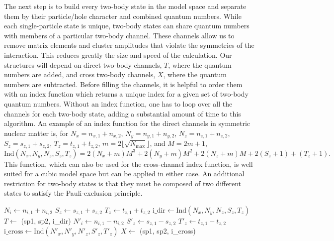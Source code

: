   The next step is to build every two-body state in the model space
  and separate them by their particle/hole character and combined
  quantum numbers. While each single-particle state is unique,
  two-body states can share quantum numbers with members of a
  particular two-body channel. These channels allow us to remove
  matrix elements and cluster amplitudes that violate the symmetries
  of the interaction. This reduces greatly the size and speed of the
  calculation. Our structures will depend on direct two-body channels,
  $T$, where the quantum numbers are added, and cross two-body
  channels, $X$, where the quantum numbers are subtracted. Before
  filling the channels, it is helpful to order them with an index
  function which returns a unique index for a given set of two-body
  quantum numbers. Without an index function, one has to loop over all
  the channels for each two-body state, adding a substantial amount
  of time to this algorithm. An example of an index function for the
  direct channels in symmetric nuclear matter is, for
  $N_{x}=n_{x,1}+n_{x,2}$, $N_{y}=n_{y,1}+n_{y,2}$,
  $N_{z}=n_{z,1}+n_{z,2}$, $S_{z}=s_{z,1}+s_{z,2}$,
  $T_{z}=t_{z,1}+t_{z,2}$, $m=2\lfloor\sqrt{N_{\text{max}}}\rfloor$,
  and $M=2m+1$,
  \begin{equation}
  \text{Ind}\left( N_{x},N_{y},N_{z},S_{z},T_{z}\right)=2\left(
  N_{x}+m\right)M^{3}+2\left( N_{y}+m\right)M^{2}+2\left(
  N_{z}+m\right)M+2\left( S_{z}+1\right)+\left(T_{z}+1\right).
  \end{equation}
  This function, which can also be used for the cross-channel index
  function, is well suited for a cubic model space but can be applied
  in either case. An additional restriction for two-body states is
  that they must be composed of two different states to satisfy the
  Pauli-exclusion principle.

  \begin{algorithmic}
     
     \State $N_{i}\gets n_{i,1}+n_{i,2}$ \State
    $S_{z}\gets s_{z,1}+s_{z,2}$ \State $T_{z}\gets t_{z,1}+t_{z,2}$
    \State
    $\text{i\_dir}\gets\text{Ind}\left(N_{x},N_{y},N_{z},S_{z},T_{z}\right)$
    \State $T\gets$ (sp1, sp2, i\_dir) \State $N'_{i}\gets
    n_{i,1}-n_{i,2}$ \State $S'_{z}\gets s_{z,1}-s_{z,2}$ \State
    $T'_{z}\gets t_{z,1}-t_{z,2}$ \State
    $\text{i\_cross}\gets\text{Ind}\left(N'_{x},N'_{y},N'_{z},S'_{z},T'_{z}\right)$
    \State $X\gets$ (sp1, sp2, i\_cross) \EndIf \EndFor \EndFor
  \end{algorithmic}

